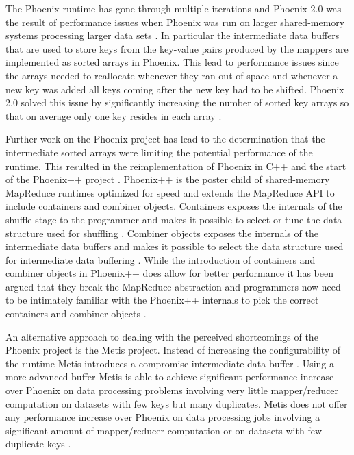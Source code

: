 \documentclass[twocolumn,11px]{article}       %
\begin{document}
The Phoenix runtime has gone through multiple iterations and Phoenix 2.0 was the
result of performance issues when Phoenix was run on larger shared-memory
systems processing larger data sets \cite{Phoenix2}. In particular the
intermediate data buffers that are used to store keys from the key-value pairs
produced by the mappers are implemented as sorted arrays in Phoenix. This lead
to performance issues since the arrays needed to reallocate whenever they ran
out of space and whenever a new key was added all keys coming after the new key
had to be shifted. Phoenix 2.0 solved this issue by significantly increasing the
number of sorted key arrays so that on average only one key resides in each
array \cite{Phoenix2}.

Further work on the Phoenix project has lead to the determination that the
intermediate sorted arrays were limiting the potential performance of the
runtime. This resulted in the reimplementation of Phoenix in C++ and the start
of the Phoenix++ project \cite{Phoenix++}. Phoenix++ is the poster child of
shared-memory MapReduce runtimes optimized for speed and extends the MapReduce
API to include containers and combiner objects. Containers exposes the internals
of the shuffle stage to the programmer and makes it possible to select or tune
the data structure used for shuffling \cite{Phoenix++}. Combiner objects exposes
the internals of the intermediate data buffers and makes it possible to select
the data structure used for intermediate data buffering \cite{Phoenix++}. While
the introduction of containers and combiner objects in Phoenix++ does allow for
better performance it has been argued that they break the MapReduce abstraction
and programmers now need to be intimately familiar with the Phoenix++ internals
to pick the correct containers and combiner objects \cite{CilkMR}.

An alternative approach to dealing with the perceived shortcomings of the
Phoenix project is the Metis project. Instead of increasing the configurability
of the runtime Metis introduces a compromise intermediate data buffer
\cite{Metis}. Using a more advanced buffer Metis is able to achieve significant
performance increase over Phoenix on data processing problems involving very
little mapper/reducer computation on datasets with few keys but many duplicates.
Metis does not offer any performance increase over Phoenix on data processing
jobs involving a significant amount of mapper/reducer computation or on datasets
with few duplicate keys \cite{Metis}.
\end{document}
